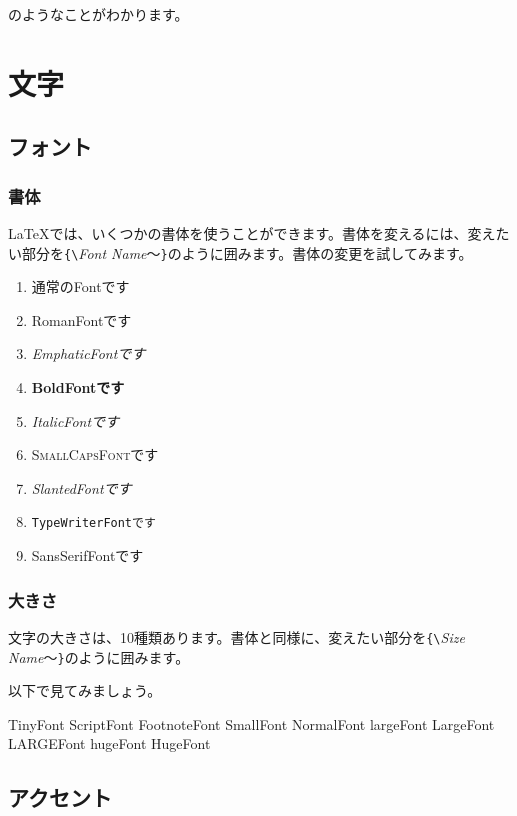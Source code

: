 \documentclass{jsbook}
\begin{document}
\noindent
のようなことがわかります。 

\section{文字}
\label{sec:symbols}

\subsection{フォント}
\label{sec:font}

\subsubsection{書体}
\label{sec:shape}

\LaTeX では、いくつかの書体を使うことができます。書体を変えるには、変えたい部分を\verb+{\+\emph{Font Name}〜\verb+}+のように囲みます。書体の変更を試してみます。

\begin{enumerate}
\item 通常のFontです
\item \textrm{RomanFontです}
\item \emph{EmphaticFontです}
\item \textbf{BoldFontです}
\item \textit{ItalicFontです}
\item \textsc{SmallCapsFontです}
\item \textsl{SlantedFontです}
\item \texttt{TypeWriterFontです}
\item \textsf{SansSerifFontです}
\end{enumerate}

\subsubsection{大きさ}
\label{sec:fontsize}

文字の大きさは、10種類あります。書体と同様に、変えたい部分を\verb+{\+\emph{Size Name}〜\verb+}+のように囲みます。

以下で見てみましょう。

{\tiny TinyFont}
{\scriptsize ScriptFont}
{\footnotesize FootnoteFont}
{\small SmallFont}
{\normalsize NormalFont}
{\large largeFont}
{\Large LargeFont}
{\LARGE LARGEFont}
{\huge hugeFont}
{\Huge HugeFont}

\subsection{アクセント}
\label{sec:accent}
\end{document}

